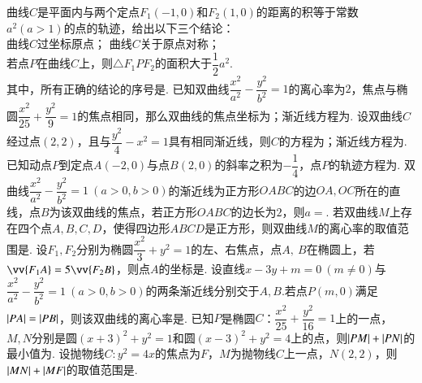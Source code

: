 \documentclass{BHCexam}
\begin{document}
\begin{questions}
\qs 曲线$ C $是平面内与两个定点$ F_1(-1,0) $和$ F_2(1,0) $的距离的积等于常数$ a^2 (a>1)$的点的轨迹，给出以下三个结论：\\
曲线$ C $过坐标原点；\qquad
{}曲线$ C $关于原点对称；\\
若点$ P $在曲线$ C $上，则$                                                                                                                                                                                                                              \triangle F_1PF_2 $的面积大于$ \dfrac{1}{2}a^2 $.\\
其中，所有正确的结论的序号是\tk.
\qs 已知双曲线$\dfrac{x^2}{a^2}-\dfrac{y^2}{b^2}=1$的离心率为$ 2 $，焦点与椭圆$ \dfrac{x^2}{25}+\dfrac{y^2}{9}=1 $的焦点相同，那么双曲线的焦点坐标为\tk；渐近线方程为\tk.
\qs 设双曲线$ C $经过点$ \left(2,2\right) $，且与$ \dfrac{y^2}{4}-x^2=1 $具有相同渐近线，则$ C $的方程为\tk；渐近线方程为\tk. 
\qs 已知动点$ P $到定点$ A(-2,0) $与点$ B(2,0)$的斜率之积为$ -\dfrac{1}{4} $，点$ P 		$的轨迹方程为\tk.
\qs 双曲线$\dfrac{x^2}{a^2}-\dfrac{y^2}{b^2}=1~(a>0,b>0)$的渐近线为正方形$ OABC $的边$ OA,OC $所在的直线，点$ B $为该双曲线的焦点，若正方形$ OABC $的边长为$ 2 $，则$ a= $\tk.
\qs 若双曲线$ M $上存在四个点$ A,B,C,D $，使得四边形$ ABCD $是正方形，则双曲线$ M $的离心率的取值范围是\tk.
\qs 设$ F_1,F_2 $分别为椭圆$ \dfrac{x^2}{3}+y^2=1 $的左、右焦点，点$ A,~B $在椭圆上，若$ \vv{F_1A}=5\vv{F_2B} $，则点$ A $的坐标是\tk.
\qs 设直线$ x-3y+m=0 ~(m\ne0)$与$ \dfrac{x^2}{a^2}-\dfrac{y^2}{b^2}=1~(a>0,b>0)$的两条渐近线分别交于$ A,B .$若点$ P(m,0) $满足$ \left| PA \right|=\left| PB \right| $，则该双曲线的离心率是\tk.
\qs 已知$ P $是椭圆$C$：$\dfrac{x^2}{25}+\dfrac{y^2}{16}=1$上的一点，$ M,N $分别是圆$ \left(x+3\right)^2+y^2=1 $和圆$ \left(x-3\right)^2+y^2=4 $上的点，则$ \left| PM \right|+\left| PN \right| $的最小值为\tk.
\qs 设抛物线$ C:y^2=4x $的焦点为$ F $，$ M $为抛物线$ C $上一点，$ N(2,2) $，则$ \left| MN \right|+\left| MF \right| $的取值范围是\tk.
\end{questions}
\end{document}

